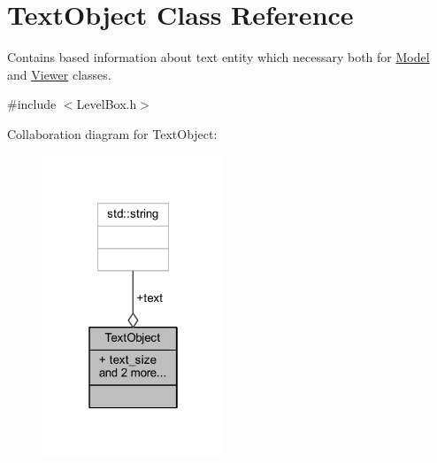 \hypertarget{class_text_object}{}\section{Text\+Object Class Reference}
\label{class_text_object}


Contains based information about text entity which necessary both for \hyperlink{class_model}{Model} and \hyperlink{class_viewer}{Viewer} classes.  




{\ttfamily \#include $<$Level\+Box.\+h$>$}



Collaboration diagram for Text\+Object\+:
\nopagebreak
\begin{figure}[H]
\begin{center}
\leavevmode
\includegraphics[width=154pt]{class_text_object__coll__graph}
\end{center}
\end{figure}
